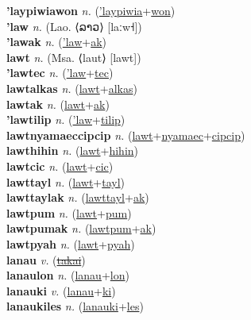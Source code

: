 \textbf{'laypiwiawon} \textit{n.} (\hyperref['laypiwia]{'laypiwia}+\hyperref[won]{won})
 \label{'laypiwiawon} \\
\textbf{'law} \textit{n.} (Lao. ⟨ລາວ⟩ [laːw˧])
 \label{'law} \\
\textbf{'lawak} \textit{n.} (\hyperref['law]{'law}+\hyperref[ak]{ak})
 \label{'lawak} \\
\textbf{lawt} \textit{n.} (Msa. ⟨laut⟩ [lawt])
 \label{lawt} \\
\textbf{'lawtec} \textit{n.} (\hyperref['law]{'law}+\hyperref[tec]{tec})
 \label{'lawtec} \\
\textbf{lawtalkas} \textit{n.} (\hyperref[lawt]{lawt}+\hyperref[alkas]{alkas})
 \label{lawtalkas} \\
\textbf{lawtak} \textit{n.} (\hyperref[lawt]{lawt}+\hyperref[ak]{ak})
 \label{lawtak} \\
\textbf{'lawtilip} \textit{n.} (\hyperref['law]{'law}+\hyperref[tilip]{tilip})
 \label{'lawtilip} \\
\textbf{lawtnyamaeccipcip} \textit{n.} (\hyperref[lawt]{lawt}+\hyperref[nyamaec]{nyamaec}+\hyperref[cipcip]{cipcip})
 \label{lawtnyamaeccipcip} \\
\textbf{lawthihin} \textit{n.} (\hyperref[lawt]{lawt}+\hyperref[hihin]{hihin})
 \label{lawthihin} \\
\textbf{lawtcic} \textit{n.} (\hyperref[lawt]{lawt}+\hyperref[cic]{cic})
 \label{lawtcic} \\
\textbf{lawttayl} \textit{n.} (\hyperref[lawt]{lawt}+\hyperref[tayl]{tayl})
 \label{lawttayl} \\
\textbf{lawttaylak} \textit{n.} (\hyperref[lawttayl]{lawttayl}+\hyperref[ak]{ak})
 \label{lawttaylak} \\
\textbf{lawtpum} \textit{n.} (\hyperref[lawt]{lawt}+\hyperref[pum]{pum})
 \label{lawtpum} \\
\textbf{lawtpumak} \textit{n.} (\hyperref[lawtpum]{lawtpum}+\hyperref[ak]{ak})
 \label{lawtpumak} \\
\textbf{lawtpyah} \textit{n.} (\hyperref[lawt]{lawt}+\hyperref[pyah]{pyah})
 \label{lawtpyah} \\
\textbf{lanau} \textit{v.} (\hyperref[takai]{\sout{takai}})
 \label{lanau} \\
\textbf{lanaulon} \textit{n.} (\hyperref[lanau]{lanau}+\hyperref[lon]{lon})
 \label{lanaulon} \\
\textbf{lanauki} \textit{v.} (\hyperref[lanau]{lanau}+\hyperref[ki]{ki})
 \label{lanauki} \\
\textbf{lanaukiles} \textit{n.} (\hyperref[lanauki]{lanauki}+\hyperref[les]{les})
